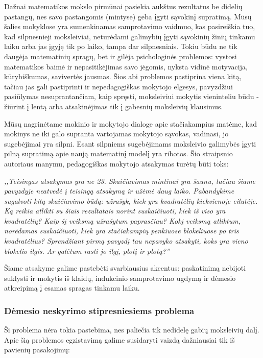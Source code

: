 \documentclass{article}
\begin{document}
Dažnai matematikos mokslo pirmūnai pasiekia aukštus rezultatus be didelių pastangų, nes savo pastangomis (mintyse) geba įgyti sąvokinį supratimą. Mūsų šalies mokyklose yra sumenkinamas samprotavimo vaidmuo, kas pasireiškia tuo, kad silpnesnieji moksleiviai, neturėdami galimybių įgyti sąvokinių žinių tinkamu laiku arba jas įgyję tik po laiko, tampa dar silpnesniais. Tokiu būdu ne tik daugėja matematinių spragų, bet ir gilėja psichologinės problemos: vystosi matematikos baimė ir nepasitikėjimas savo jėgomis, nyksta vidinė motyvacija, kūrybiškumas, savivertės jausmas. Šios abi problemos pastiprina viena kitą, tačiau jas gali pastiprinti ir nepedagogiškas mokytojo elgesys, pavyzdžiui pasiūlymas nesuprantančiam, kaip spręsti, moksleiviui mokytis vieninteliu būdu - žiūrint į lentą arba atsakinėjimas tik į gabesnių moksleivių klausimus.

Mūsų nagrinėtame mokinio ir mokytojo dialoge apie stačiakampius matėme, kad mokinys ne iki galo supranta vartojamas mokytojo sąvokas, vadinasi, jo sugebėjimai yra silpni. Esant silpniems sugebėjimams moksleivio galimybės įgyti pilną supratimą apie naują matematinį modelį yra ribotos. Šio straipsnio autoriaus manymu, pedagogiškas mokytojo atsakymas turėtų būti toks:

\textit{,,Teisingas atsakymas yra ne 23. Skaičiavimas mintinai yra šaunu, tačiau šiame pavyzdyje neatvedė į teisingą atsakymą ir užėmė daug laiko. Pabandykime sugalvoti kitą skaičiavimo būdą: užrašyk, kiek yra kvadratėlių kiekvienoje eilutėje. Ką reikia atlikti su šiais rezultatais norint suskaičiuoti, kiek iš viso yra kvadratėlių? Kaip šį veiksmą užrašytum paprasčiau? Kokį veiksmą atliktum, norėdamas suskaičiuoti, kiek yra stačiakampių penkiuose blokeliuose po tris kvadratėlius? Sprendžiant pirmą pavyzdį tau nepavyko atsakyti, koks yra vieno blokelio ilgis. Ar galėtum rasti jo ilgį, plotį ir plotą?''}

Šiame atsakyme galime pastebėti svarbiausius akcentus: paskatinimą nebijoti suklysti ir mokytis iš klaidų, indukcinio samprotavimo ugdymą ir dėmesio atkreipimą į esamas spragas tinkamu laiku.

\subsubsection{Dėmesio neskyrimo stipresniesiems problema}

Ši problema nėra tokia pastebima, nes paliečia tik nedidelę gabių moksleivių dalį. Apie šią problemos egzistavimą galime susidaryti vaizdą dažniausiai tik iš pavienių pasakojimų:
\end{document}
